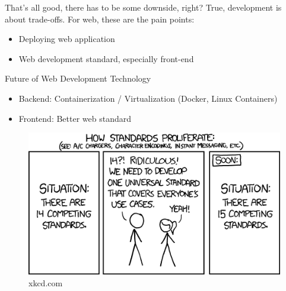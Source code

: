 \documentclass{beamer}
\begin{document}
  \begin{frame}{That's all good, there has to be some downside, right?}
  	\pause
	True, development is about trade-offs. For web, these are the pain points:
	\pause
	\begin{itemize}[<+->]
		\item Deploying web application
		\item Web development standard, especially front-end
  	\end{itemize}
  \end{frame}
  
  
   \begin{frame}{Future of Web Development Technology}
   	\pause
	\begin{itemize}[<+->]
		\item Backend: Containerization / Virtualization (Docker, Linux Containers)
		\item Frontend: Better web standard \footnotemark[1] \footnotemark[2] 
	\end{itemize}
	\pause
	\begin{center}
		\begin{figure}
		\includegraphics[scale=0.485]{images/standards.png}
		\caption{xkcd.com}
		\end{figure}
	\end{center}



  \end{frame}
\end{document}
